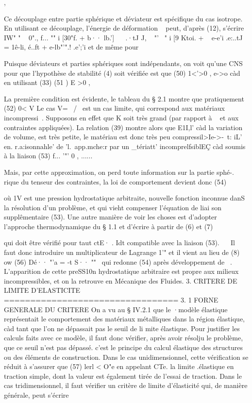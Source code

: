 {{, 

Ce découplage entre partie sphérique et déviateur est spécifique du cas iso­trope. En utilisant ce découplage, l'énergie de déformation ~ peut, d'après (12), s'écrire 
IW" " ~ 0"., f... "" i [30"f. + b·· lb.']
~ ~.·tJ J, ~ "'~ 
" i [9 Ktoi. + ~ e-e'i .e:..tJ = 1ê-li, é..ft + e-lb"'".! .e';'i 
et de même pour 

Puisque déviateurs et parties sphériques sont indépendants, on voit qu'une CNS pour que l'hypothèse de stabilité (4) soit vérifiée est que 
(50) 1<'>0 , e->o càd en utilisant (33) 
(51 ) E >0 , 


La première condition est évidente, le tableau du § 2.1 montre que pratique­ment 
(52) 0< V 
Le cas V= ~/~ est un cas limite, qui correspond aux matériaux incompressi­~. Supposons en effet que K soit très grand (par rapport à ~ et aux contraintes appliquées). La relation (39) montre alors que E1I,l' càd la variation de volume, est très petite, le matériau est donc très peu compres­sil>Ie->-~t: iL' en. r.a:isonnahle' de 'l.~app.mche:r par un _tériatt' incomprelfsiblEÇ càd soumis à la liaison 
(53) f... '"' 0 ,
...... 

Mais, par cette approximation, on perd toute information sur la partie sphé-. rique du tenseur des contraintes, la loi de comportement devient donc 
(54) 

où 1V est une pression hydrostatique arbitraite, nouvelle fonction inconnue danS la résolution d'un problème, et qui vieht compenser l'équation de liai­
son supplêmentaire (53). Une autre manière de voir les choses est d'adopter l'approche thermodynamique du § 1.1 et d'écrire à partir de (6) et (7) 

qui doit être vérifié pour taut ctE· . Idt compatible avec la liaison (53). 
~~ 
Il faut donc introduire un multiplicateur de Lagrange 1'" et il vient au lieu de (8) 
ow
(56) Dé·· "'a
= -t S·· 
""~ qui redonne (54) après développement de ~. L'apparition de cette preSS10n 
hydrostatique arbitraire est propre aux milieux incompressibles, et on la retrouve en Mécanique des Fluides. 
3. CRITERE DE LIMITE D'ELASTICITE 
================================= 
3. 1 FORNE GENERALE DU CRITERE 
On a vu au § IV.2.1 que le 
·modèle élastique représentait le com­portement des matériaux métalliques 
dans la région élastique, càd tant que 
l'on ne dépassait pas le seuil de li­
mite élastique. Pour justifier les calculs faits avec ce modèle, il faut 
donc vérifier, après avoir résolju le problème, que ce seuil n'est pas dépassé. c'est le principe du calcul élastique des structures ou des éléments de cons­truction. 
Dans le cas unidimensionnel, cette vérification se réduit à s'assu­rer que 
(57) 
lerl < O"e 
en appelant CTe. la limite .élastique en traction simple, dont la valeur est également tirée de l'essai de traction. 
Dans le cas tridimensionnel, il faut vérifier un critère de limite d'élasticité qui, de manière générale, peut s'écrire 

}}
